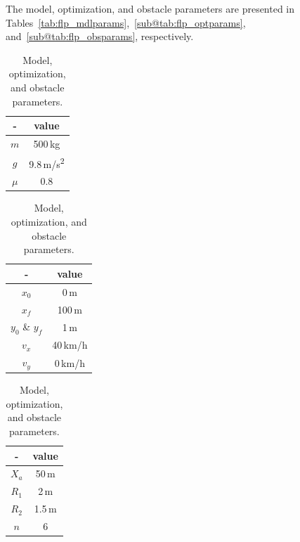 The model, optimization, and obstacle parameters are presented in Tables~\ref{tab:flp_mdlparams},~\ref{sub@tab:flp_optparams}, and~\ref{sub@tab:flp_obsparams}, respectively. 

\begin{table}[h!]
    \begin{subtable}[h]{0.3\textwidth}
        \centering
        \begin{tabular}{c|c}
            - & value \\
            \hline
            $m$ & 500\,kg\\
            $g$ & 9.8\,m/s\textsuperscript{2}\\
            $\mu$ & 0.8\\
        \end{tabular}
        \caption{Model parameters}
        \label{tab:flp_mdlparams}
    \end{subtable}
    \hfill
    \begin{subtable}[h]{0.3\textwidth}
        \centering
        \begin{tabular}{c|c}
            - & value \\
            \hline
            $x_0$ & 0\,m\\
            $x_f$ & 100\,m\\
            $y_0$ \& $y_f$ & 1\,m\\
            $v_x$ & 40\,km/h\\
            $v_y$ & 0\,km/h
        \end{tabular}
        \caption{Optimization parameters}
        \label{tab:flp_optparams}
    \end{subtable}
    \hfill
    \begin{subtable}[h]{0.3\textwidth}
        \centering
        \begin{tabular}{c|c}
            - & value \\
            \hline
            $X_a$ & 50\,m\\
            $R_1$ & 2\,m\\
            $R_2$ & 1.5\,m\\
            $n$ & 6\\
        \end{tabular}
        \caption{Obstacle parameters}
        \label{tab:flp_obsparams}
    \end{subtable}
    \caption{Model, optimization, and obstacle parameters.}
    \label{tab:temps}
\end{table}

